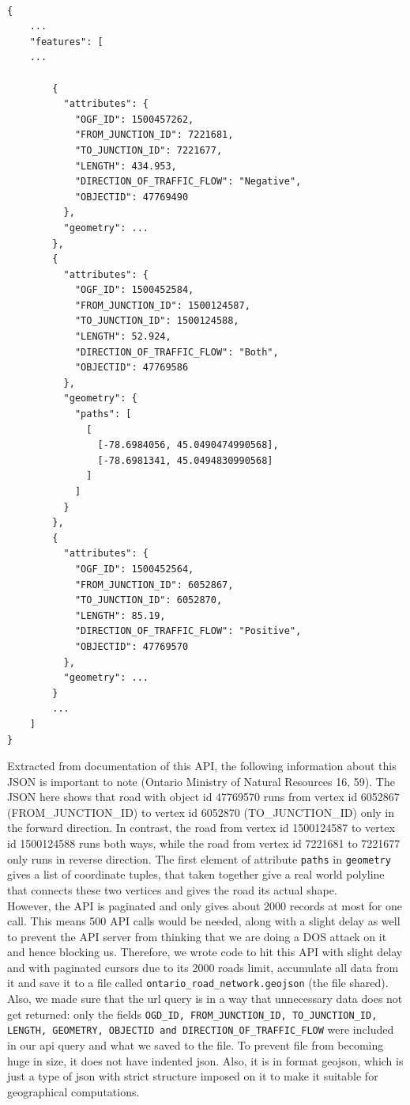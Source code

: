 \documentclass[fontsize=11pt]{article}
\begin{document}
\begin{verbatim}

{
    ...
    "features": [
    ...

        {
          "attributes": {
            "OGF_ID": 1500457262,
            "FROM_JUNCTION_ID": 7221681,
            "TO_JUNCTION_ID": 7221677,
            "LENGTH": 434.953,
            "DIRECTION_OF_TRAFFIC_FLOW": "Negative",
            "OBJECTID": 47769490
          },
          "geometry": ...
        },
        {
          "attributes": {
            "OGF_ID": 1500452584,
            "FROM_JUNCTION_ID": 1500124587,
            "TO_JUNCTION_ID": 1500124588,
            "LENGTH": 52.924,
            "DIRECTION_OF_TRAFFIC_FLOW": "Both",
            "OBJECTID": 47769586
          },
          "geometry": {
            "paths": [
              [
                [-78.6984056, 45.0490474990568],
                [-78.6981341, 45.0494830990568]
              ]
            ]
          }
        },
        {
          "attributes": {
            "OGF_ID": 1500452564,
            "FROM_JUNCTION_ID": 6052867,
            "TO_JUNCTION_ID": 6052870,
            "LENGTH": 85.19,
            "DIRECTION_OF_TRAFFIC_FLOW": "Positive",
            "OBJECTID": 47769570
          },
          "geometry": ...
        }
        ...
    ]
}

\end{verbatim}

Extracted from documentation of this API, the following information about this JSON is important to note (Ontario Ministry of Natural Resources 16, 59). The JSON here shows that road with object id 47769570 runs from vertex id 6052867 (FROM\_JUNCTION\_ID) to vertex id 6052870 (TO\_JUNCTION\_ID) only in the forward direction. In contrast, the road from vertex id 1500124587 to vertex id 1500124588 runs both ways, while the road from vertex id 7221681 to 7221677 only runs in reverse direction. The first element of attribute \texttt{paths} in \texttt{geometry} gives a list of coordinate tuples, that taken together give a real world polyline that connects these two vertices and gives the road its actual shape. \\ 
 
However, the API is paginated and only gives about 2000 records at most for one call. This means 500 API calls would be needed, along with a slight delay as well to prevent the API server from thinking that we are doing a DOS attack on it and hence blocking us. Therefore, we wrote code to hit this API with slight delay and with paginated cursors due to its 2000 roads limit, accumulate all data from it and save it to a file called \texttt{ontario\_road\_network.geojson} (the file shared). Also, we made sure that the url query is in a way that unnecessary data does not get returned: only the fields \texttt{OGD\_ID, FROM\_JUNCTION\_ID, TO\_JUNCTION\_ID, LENGTH, GEOMETRY, OBJECTID and DIRECTION\_OF\_TRAFFIC\_FLOW} were included in our api query and what we saved to the file. To prevent file from becoming huge in size, it does not have indented json. Also, it is in format geojson, which is just a type of json with strict structure imposed on it to make it suitable for geographical computations.  
\end{document}

